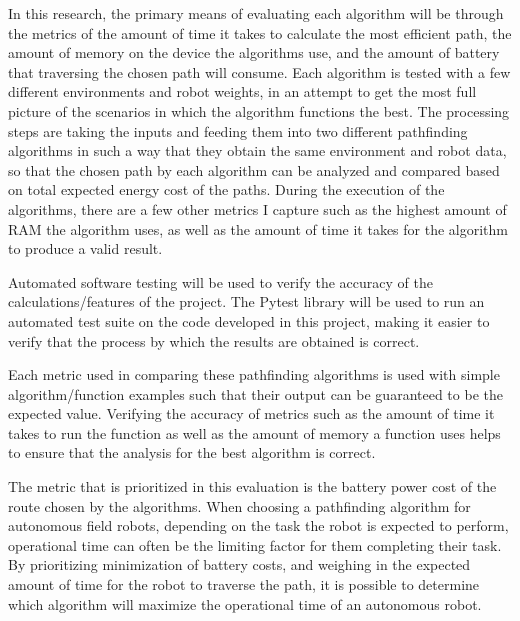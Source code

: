 In this research, the primary means of evaluating each algorithm will be through the metrics of the amount of time it takes to calculate the most efficient path, the amount of memory on the device the algorithms use, and the amount of battery that traversing the chosen path will consume. Each algorithm is tested with a few different environments and robot weights, in an attempt to get the most full picture of the scenarios in which the algorithm functions the best. The processing steps are taking the inputs and feeding them into two different pathfinding algorithms in such a way that they obtain the same environment and robot data, so that the chosen path by each algorithm can be analyzed and compared based on total expected energy cost of the paths. During the execution of the algorithms, there are a few other metrics I capture such as the highest amount of RAM the algorithm uses, as well as the amount of time it takes for the algorithm to produce a valid result.
\par
Automated software testing will be used to verify the accuracy of the calculations/features of the project. The Pytest \cite{pytest_2021} library will be used to run an automated test suite on the code developed in this project, making it easier to verify that the process by which the results are obtained is correct.
\par
Each metric used in comparing these pathfinding algorithms is used with simple algorithm/function examples such that their output can be guaranteed to be the expected value. Verifying the accuracy of metrics such as the amount of time it takes to run the function as well as the amount of memory a function uses helps to ensure that the analysis for the best algorithm is correct.
\par
The metric that is prioritized in this evaluation is the battery power cost of the route chosen by the algorithms. When choosing a pathfinding algorithm for autonomous field robots, depending on the task the robot is expected to perform, operational time can often be the limiting factor for them completing their task. By prioritizing minimization of battery costs, and weighing in the expected amount of time for the robot to traverse the path, it is possible to determine which algorithm will maximize the operational time of an autonomous robot.

